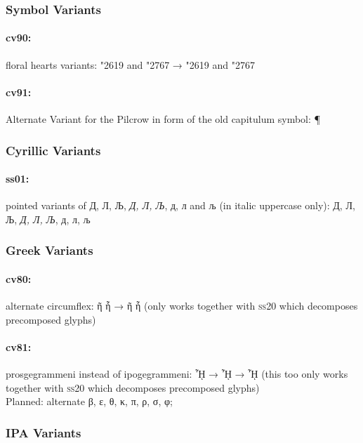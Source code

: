 \documentclass[pagesize,DIV14]{scrartcl}
\begin{document}
\subsubsection{Symbol Variants}
\paragraph*{cv90:} floral hearts variants: \char"2619{}  and \char"2767{}  → {\char"2619{} and \char"2767}

\paragraph*{cv91:} Alternate Variant for the Pilcrow in form of the old capitulum symbol: {¶}

\subsubsection{Cyrillic Variants}
\paragraph*{ss01:} pointed variants of Д, Л, Љ, \textit{Д, Л, Љ}, д, л and љ (in italic uppercase only): { Д, Л, Љ, \textit{Д, Л, Љ}, д, л, љ 
}

\subsubsection{Greek Variants}
\paragraph*{cv80:} alternate circumflex: ῆ ἧ → {ῆ ἧ} (only works together with \textsc{ss20} which decomposes precomposed glyphs)
\paragraph*{cv81:} prosgegrammeni instead of ipogegrammeni: ᾞ → { ᾞ} → { ᾞ} (this too only works together with \textsc{ss20} which decomposes precomposed glyphs)\\
Planned: alternate β, ε, θ, κ, π, ρ, σ, φ;\\

\subsubsection{IPA Variants}
\end{document}
